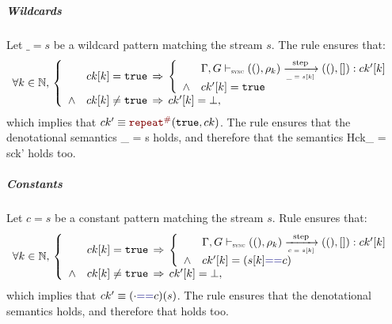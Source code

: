 \begin{skippableproof}
    \subparagraph{Wildcards}
    Let $\_ = s$ be a wildcard pattern matching the stream $s$. The rule  ensures that:
    \begin{equation*}
        \begin{array}{l}
            \forall k \in \N, \,
            \left\{
            \begin{array}{ll}
                       & ck[k] = \true \, \Rightarrow \,
                \left\{
                \begin{array}{ll}
                           & \patOpsem{\rho_k}{\_ = s[k]}{ck'[k]}{[]} \\
                    \wedge & ck'[k] = \true                           \\
                \end{array}
                \right.                                                    \\
                \wedge & ck[k] \neq \true \, \Rightarrow \, ck'[k] = \bot, \\
            \end{array}
            \right.
        \end{array}
    \end{equation*}
    which implies that $ck' \equiv \const{\true}{ck}$. The rule  ensures that the denotational semantics 
    {\_ = s}{} holds, and therefore that the semantics \patDenot
    {H}{ck}{\_ = s}{ck'} holds too.

    \subparagraph{Constants}
    Let $c = s$ be a constant pattern matching the stream $s$. Rule  ensures that:
    \begin{equation*}
        \begin{array}{l}
            \forall k \in \N, \,
            \left\{
            \begin{array}{ll}
                       & ck[k] = \true \, \Rightarrow \,
                \left\{
                \begin{array}{ll}
                           & \patOpsem{\rho_k}{c = s[k]}{ck'[k]}{[]} \\
                    \wedge & ck'[k] = (s[k] \kwf{==} c)              \\
                \end{array}
                \right.                                                    \\
                \wedge & ck[k] \neq \true \, \Rightarrow \, ck'[k] = \bot, \\
            \end{array}
            \right.
        \end{array}
    \end{equation*}
    which implies that $ck' \equiv (\cdot \kwf{==} c)(s)$. The rule  ensures that the denotational semantics  holds, and therefore that  holds too.


\end{skippableproof}
